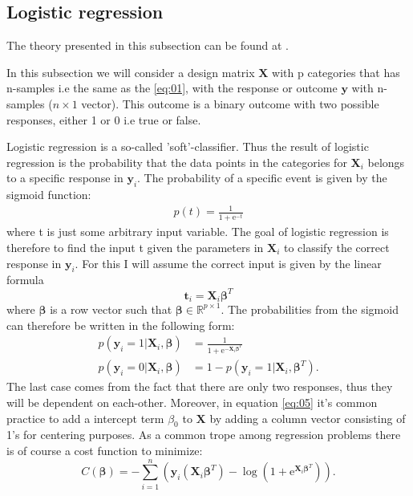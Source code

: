 \documentclass[uio,jmp,amsmath,amssymb,reprint,nofootinbib]{revtex4-1}
\numberwithin{equation}{section}
\newcommand{\e}{\mathrm{e}}
\newcommand{\lp}{\left(}
\newcommand{\rp}{\right)}
\begin{document}
\subsection{Logistic regression}

The theory presented in this subsection can be found at \cite{MHJ_LogReg}.

In this subsection we will consider a design matrix \(\bm{X}\) with p categories that has n-samples i.e the same as the \ref{eq:01}, with the response or outcome \(\bm{y}\) with n-samples (\(n\times 1\) vector). This outcome is a binary outcome with two possible responses, either 1 or 0 i.e true or false.

Logistic regression is a so-called 'soft'-classifier. Thus the result of logistic regression is the probability that the data points in the categories for \(\bm{X}_i\) belongs to a specific response in \(\bm{y}_i\). The probability of a specific event is given by the sigmoid function:
\begin{align}\label{eq:03}
p(t) = \frac{1}{1+\e^{-t}}
\end{align}
where t is just some arbitrary input variable. The goal of logistic regression is therefore to find the input t given the parameters in \(\bm{X}_i\) to classify the correct response in \(\bm{y}_i\). For this I will assume the correct input is given by the linear formula
\begin{equation}
\bm{t}_i = \bm{X}_i\bm{\beta}^T
\end{equation}
where \(\bm{\beta}\) is a row vector such that \(\bm{\beta} \in \mathbb{R}^{p\times 1}\). The probabilities from the sigmoid can therefore be written in the following form:
\begin{align}\label{eq:04}
p\lp \bm{y}_i = 1|\bm{X}_i, \bm{\beta}\rp &= \frac{1}{1+\e^{-\bm{X}_i\bm{\beta}^T}}\\ \label{eq:05}
p\lp \bm{y}_i = 0|\bm{X}_i, \bm{\beta}\rp &= 1- p\lp \bm{y}_i = 1|\bm{X}_i, \bm{\beta}^T\rp.
\end{align}
The last case comes from the fact that there are only two responses, thus they will be dependent on each-other. Moreover, in equation \ref{eq:05} it's common practice to add a intercept term \(\beta_0\) to \(\bm{X}\) by adding a column vector consisting of 1's for centering purposes.
As a common trope among regression problems there is of course a cost function to minimize:
\begin{equation}\label{eq:06}
C(\bm{\beta}) = -\sum_{i=1}^n \lp \bm{y}_i\lp \bm{X}_i\bm{\beta}^T\rp - \log(1 + \e^{\bm{X}_i\bm{\beta}^T})\rp.
\end{equation}
\end{document}
